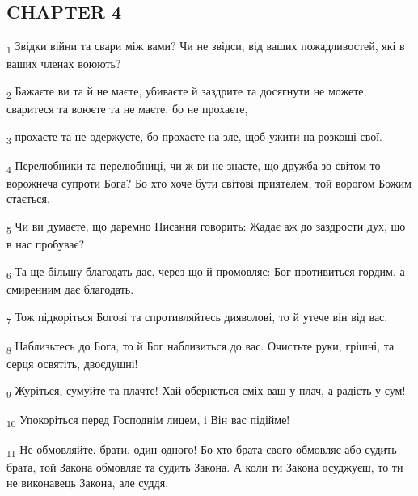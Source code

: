 \subsection{CHAPTER 4}
\begin{tcolorbox}
\textsubscript{1} Звідки війни та свари між вами? Чи не звідси, від ваших пожадливостей, які в ваших членах воюють?
\end{tcolorbox}
\begin{tcolorbox}
\textsubscript{2} Бажаєте ви та й не маєте, убиваєте й заздрите та досягнути не можете, сваритеся та воюєте та не маєте, бо не прохаєте,
\end{tcolorbox}
\begin{tcolorbox}
\textsubscript{3} прохаєте та не одержуєте, бо прохаєте на зле, щоб ужити на розкоші свої.
\end{tcolorbox}
\begin{tcolorbox}
\textsubscript{4} Перелюбники та перелюбниці, чи ж ви не знаєте, що дружба зо світом то ворожнеча супроти Бога? Бо хто хоче бути світові приятелем, той ворогом Божим стається.
\end{tcolorbox}
\begin{tcolorbox}
\textsubscript{5} Чи ви думаєте, що даремно Писання говорить: Жадає аж до заздрости дух, що в нас пробуває?
\end{tcolorbox}
\begin{tcolorbox}
\textsubscript{6} Та ще більшу благодать дає, через що й промовляє: Бог противиться гордим, а смиренним дає благодать.
\end{tcolorbox}
\begin{tcolorbox}
\textsubscript{7} Тож підкоріться Богові та спротивляйтесь дияволові, то й утече він від вас.
\end{tcolorbox}
\begin{tcolorbox}
\textsubscript{8} Наблизьтесь до Бога, то й Бог наблизиться до вас. Очистьте руки, грішні, та серця освятіть, двоєдушні!
\end{tcolorbox}
\begin{tcolorbox}
\textsubscript{9} Журіться, сумуйте та плачте! Хай обернеться сміх ваш у плач, а радість у сум!
\end{tcolorbox}
\begin{tcolorbox}
\textsubscript{10} Упокоріться перед Господнім лицем, і Він вас підійме!
\end{tcolorbox}
\begin{tcolorbox}
\textsubscript{11} Не обмовляйте, брати, один одного! Бо хто брата свого обмовляє або судить брата, той Закона обмовляє та судить Закона. А коли ти Закона осуджуєш, то ти не виконавець Закона, але суддя.
\end{tcolorbox}
